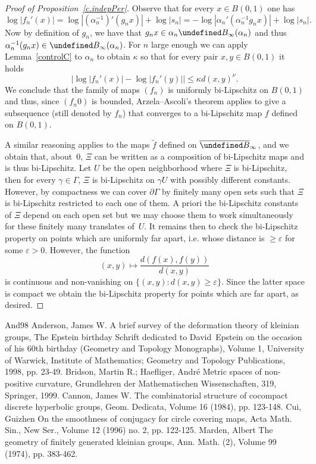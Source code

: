 \documentclass[10pt,a4paper]{article}
\theoremstyle{definition}
\let\cal\undefined
\renewcommand{\sf}[1]{{\mathsf{#1}}}
\newcommand{\G}{\sf{\Gamma}}
\newcommand{\cal}{\mathcal}
\newcommand{\eps}{\varepsilon}
\newcommand{\g}{\gamma}
\newcommand{\bord}{\partial}
\newcommand{\ov}{\overline}
\renewcommand{\/}{\backslash}
\newcommand{\<}{\langle}
\renewcommand{\>}{\rangle}
\numberwithin{equation}{section}
\begin{document}
\begin{proof}[Proof of Proposition~\ref{c.indepPer}]
Observe that for every $x\in B(0,1)$ one has
\[
\log\left|f_n'(x)\right|=\log\left|\left(\alpha_n^{-1}\right)'(g_nx)\right|+\log|s_n|= -\log\left|\alpha_n'\left(\alpha_n^{-1}g_nx\right)\right|+\log|s_n|.
\]
Now by definition of $g_n$, we have that $g_nx \in\alpha_n\cal B_\infty(\alpha_n)$ and thus $\alpha_n^{-1}(g_nx)\in\cal B_\infty(\alpha_n)$. For $n$ large enough we can apply Lemma~\ref{controlC} to $\alpha_n$ to obtain $\kappa$ so that for every pair $x,y\in B(0,1)$ it holds
\[
\bigl\lvert\log\left|f_n'(x)\right|-\log\left|f_n'(y)\right|\bigr|\leq \kappa d(x,y)^\nu.
\]
We conclude that the family of maps $(f_n)$ is uniformly bi-Lipschitz on $B(0,1)$ and thus, since $(f_n0)$ is bounded, Arzela--Ascoli's theorem applies to give a subsequence (still denoted by $f_n$) that converges to a bi-Lipschitz map $f$ defined on $B(0,1)$.


A similar reasoning applies to the maps $\tilde f$ defined on $\ov{\cal B}_\infty$, and we obtain that, about~$0$, $\Xi$ can be written as a composition of bi-Lipschitz maps and is thus bi-Lipschitz. Let $U$ be the open neighborhood where $\Xi$ is bi-Lipschitz, then for every $\g\in\G$, $\Xi$ is bi-Lipschitz on $\g U$ with possibly different constants. However, by compactness we can cover $\bord\G$ by finitely many open sets such that $\Xi$ is bi-Lipschitz restricted to each one of them. A priori the bi-Lipschitz constants of $\Xi$ depend on each open set but we may choose them to work simultaneously for these finitely many translates of~$U$. It remains then to check the bi-Lipschitz property on points which are uniformly far apart, i.e. whose distance is $\geq\eps$ for some $\eps>0$. However, the function
\[
(x,y)\mapsto \frac{d(f(x),f(y))}{d(x,y)}
\]
is continuous and non-vanishing on $\{(x,y):d(x,y)\geq\eps\}$. Since the latter space is compact we obtain the bi-Lipschitz property for points which are far apart, as desired.
\end{proof}

\begin{thebibliography}{And98}
 Anderson, James W. A brief survey of the deformation theory of kleinian groups, The Epstein birthday Schrift dedicated to David Epstein on the occasion of his 60th birthday (Geometry and Topology Monographs), Volume 1, University of Warwick, Institute of Mathematics; Geometry and Topology Publications, 1998, pp. 23-49.
 Bridson, Martin R.; Haefliger, André Metric spaces of non-positive curvature, Grundlehren der Mathematischen Wissenschaften, 319, Springer, 1999.
 Cannon, James W. The combinatorial structure of cocompact discrete hyperbolic groups, Geom. Dedicata, Volume 16 (1984), pp. 123-148.
 Cui, Guizhen On the smoothness of conjugacy for circle covering maps, Acta Math. Sin., New Ser., Volume 12 (1996) no. 2, pp. 122-125.
 Marden, Albert The geometry of finitely generated kleinian groups, Ann. Math. (2), Volume 99 (1974), pp. 383-462.
\end{thebibliography}
\end{document}
